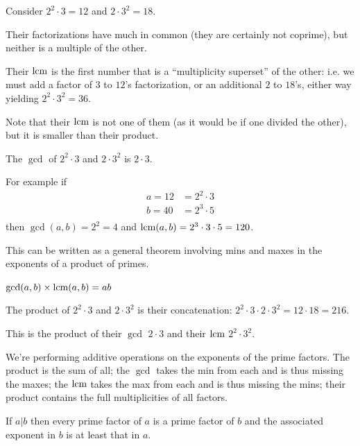\begin{example*}
Consider $2^2 \cdot 3 = 12$ and $2\cdot 3^2 = 18$.

Their factorizations have much in common (they are certainly not coprime), but neither is a
multiple of the other.

Their $\text{lcm}$ is the first number that is a ``multiplicity superset​'' of the other: i.e. we must add
a factor of $3$ to $12$'s factorization, or an additional $2$ to $18$'s, either way
yielding $2^2 \cdot 3^2 = 36$.

Note that their $\text{lcm}$ is not one of them (as it would be if one divided the other), but it is
smaller than their product.

The $\gcd$ of $2^2\cdot 3$ and $2\cdot 3^2$ is $2\cdot 3$.
\end{example*}


\begin{example*}
    For example if
  \begin{align*}
    a = 12 &= 2^2 \cdot 3 \\
    b = 40 &= 2^3 \cdot 5 \\
  \end{align*}
  then $\gcd(a, b) = 2^2 = 4$ and $\text{lcm}(a, b) = 2^3 \cdot 3 \cdot 5 = 120$.

  This can be written as a general theorem involving mins and maxes in the exponents of a product
  of primes.
\end{example*}


\begin{theorem*}
  $\gcd(a,b) \times \text{lcm}(a,b) = ab$
\end{theorem*}

\begin{example*}
  The product of  $2^2\cdot 3$ and $2\cdot 3^2$ is their concatenation: $2^2 \cdot 3 \cdot 2 \cdot 3^2 = 12 \cdot 18 = 216$.

  This is the product of their $\gcd$ $2\cdot 3$ and their $\text{lcm}$ $2^2\cdot 3^2$.
\end{example*}


\begin{intuition*}
  We're performing additive operations on the exponents of the prime factors. The product is the
  sum of all; the $\gcd$ takes the min from each and is thus missing the maxes; the $\text{lcm}$ takes
  the max from each and is thus missing the mins; their product contains the full multiplicities of
  all factors.
\end{intuition*}


\begin{theorem*}
  If $a|b$ then every prime factor of $a$ is a prime factor of $b$ and the associated exponent
  in $b$ is at least that in $a$.
\end{theorem*}

